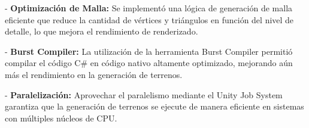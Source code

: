 - \textbf{Optimización de Malla:} Se implementó una lógica de generación de malla eficiente que reduce la cantidad de vértices y triángulos en función del nivel de detalle, lo que mejora el rendimiento de renderizado.

- \textbf{Burst Compiler:} La utilización de la herramienta Burst Compiler permitió compilar el código C\# en código nativo altamente optimizado, mejorando aún más el rendimiento en la generación de terrenos.

- \textbf{Paralelización:} Aprovechar el paralelismo mediante el Unity Job System garantiza que la generación de terrenos se ejecute de manera eficiente en sistemas con múltiples núcleos de CPU.










